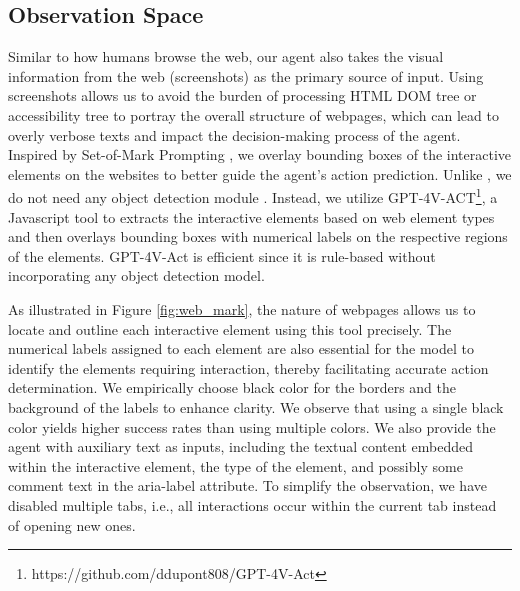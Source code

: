 \documentclass[11pt]{article}
\newcommand{\kaixin}[2][]{\todo[color=green,size=\scriptsize,fancyline,caption={},#1]{KM:#2}}
\begin{document}
\subsection{Observation Space}
Similar to how humans browse the web, our agent also takes the visual information from the web (screenshots) as the primary source of input. Using screenshots allows us to avoid the burden of processing HTML DOM tree or accessibility tree to portray the overall structure of webpages, which can lead to overly verbose texts and impact the decision-making process of the agent. Inspired by Set-of-Mark Prompting \citep{yang2023set}, we overlay bounding boxes of the interactive elements on the websites to better guide the agent's action prediction. Unlike \citet{yang2023set}, we do not need any object detection module \citep{zou2023object}. Instead, we utilize %
GPT-4V-ACT\footnote{https://github.com/ddupont808/GPT-4V-Act}, a Javascript tool to extracts the interactive elements based on web element types and then overlays bounding boxes with numerical labels on the respective regions of the elements. GPT-4V-Act is efficient since it is rule-based without incorporating any object detection model. %

As illustrated in Figure \ref{fig:web_mark}, the nature of webpages allows us to locate and outline each interactive element using this tool precisely. The numerical labels assigned to each element are also essential for the model to identify the elements requiring interaction, thereby facilitating accurate action determination. We empirically choose black color for the borders and the background of the labels to enhance clarity. We observe that using a single black color yields higher success rates than using multiple colors.
We also provide the agent with auxiliary text as inputs, including the textual content embedded within the interactive element, the type of the element, and possibly some comment text in the aria-label attribute. To simplify the observation, we have disabled multiple tabs, i.e., all interactions occur within the current tab instead of opening new ones. 
\end{document}
